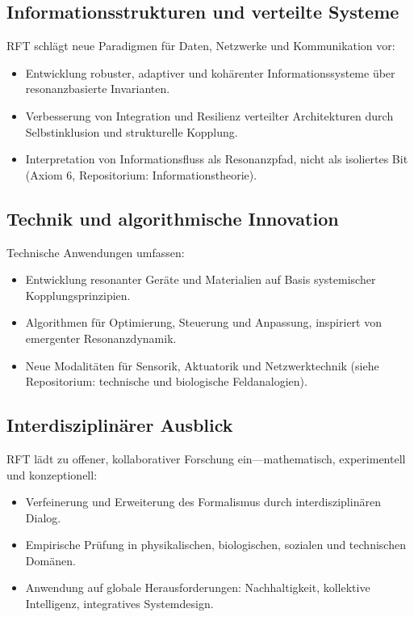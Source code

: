 \documentclass[12pt]{article}
\begin{document}
\subsection{Informationsstrukturen und verteilte Systeme}

RFT schlägt neue Paradigmen für Daten, Netzwerke und Kommunikation vor:
\begin{itemize}
	\item Entwicklung robuster, adaptiver und kohärenter Informationssysteme über resonanzbasierte Invarianten.
	\item Verbesserung von Integration und Resilienz verteilter Architekturen durch Selbstinklusion und strukturelle Kopplung.
	\item Interpretation von Informationsfluss als Resonanzpfad, nicht als isoliertes Bit (Axiom 6, Repositorium: Informationstheorie).
\end{itemize}

\subsection{Technik und algorithmische Innovation}

Technische Anwendungen umfassen:
\begin{itemize}
	\item Entwicklung resonanter Geräte und Materialien auf Basis systemischer Kopplungsprinzipien.
	\item Algorithmen für Optimierung, Steuerung und Anpassung, inspiriert von emergenter Resonanzdynamik.
	\item Neue Modalitäten für Sensorik, Aktuatorik und Netzwerktechnik (siehe Repositorium: technische und biologische Feldanalogien).
\end{itemize}

\subsection{Interdisziplinärer Ausblick}

RFT lädt zu offener, kollaborativer Forschung ein—mathematisch, experimentell und konzeptionell:
\begin{itemize}
	\item Verfeinerung und Erweiterung des Formalismus durch interdisziplinären Dialog.
	\item Empirische Prüfung in physikalischen, biologischen, sozialen und technischen Domänen.
	\item Anwendung auf globale Herausforderungen: Nachhaltigkeit, kollektive Intelligenz, integratives Systemdesign.
\end{itemize}
\end{document}
